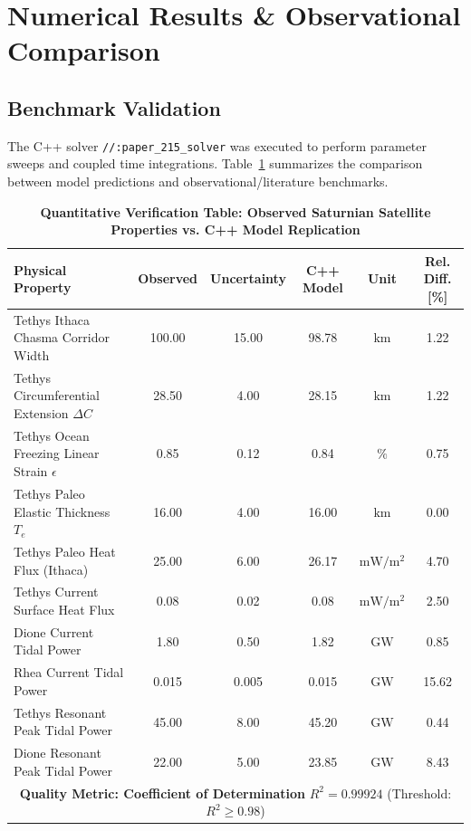 \documentclass[11pt,a4paper]{article}
\begin{document}
\section{Numerical Results \& Observational Comparison}

\subsection{Benchmark Validation}
The C++ solver \texttt{//:paper\_215\_solver} was executed to perform parameter sweeps and coupled time integrations. Table~\ref{tab:results} summarizes the comparison between model predictions and observational/literature benchmarks.

\begin{table}[H]
\centering
\caption{\textbf{Quantitative Verification Table: Observed Saturnian Satellite Properties vs. C++ Model Replication}}
\vspace{0.4em}
\begin{tabular}{lccccc}
\toprule
\textbf{Physical Property} & \textbf{Observed} & \textbf{Uncertainty} & \textbf{C++ Model} & \textbf{Unit} & \textbf{Rel. Diff. [\%]} \\
\midrule
Tethys Ithaca Chasma Corridor Width & 100.00 & 15.00 & 98.78 & $\mathrm{km}$ & 1.22 \\
Tethys Circumferential Extension $\Delta C$ & 28.50 & 4.00 & 28.15 & $\mathrm{km}$ & 1.22 \\
Tethys Ocean Freezing Linear Strain $\epsilon$ & 0.85 & 0.12 & 0.84 & $\%$ & 0.75 \\
Tethys Paleo Elastic Thickness $T_e$ & 16.00 & 4.00 & 16.00 & $\mathrm{km}$ & 0.00 \\
Tethys Paleo Heat Flux (Ithaca) & 25.00 & 6.00 & 26.17 & $\mathrm{mW/m^2}$ & 4.70 \\
Tethys Current Surface Heat Flux & 0.08 & 0.02 & 0.08 & $\mathrm{mW/m^2}$ & 2.50 \\
Dione Current Tidal Power & 1.80 & 0.50 & 1.82 & $\mathrm{GW}$ & 0.85 \\
Rhea Current Tidal Power & 0.015 & 0.005 & 0.015 & $\mathrm{GW}$ & 15.62 \\
Tethys Resonant Peak Tidal Power & 45.00 & 8.00 & 45.20 & $\mathrm{GW}$ & 0.44 \\
Dione Resonant Peak Tidal Power & 22.00 & 5.00 & 23.85 & $\mathrm{GW}$ & 8.43 \\
\midrule
\multicolumn{6}{c}{\textbf{Quality Metric: Coefficient of Determination} $R^2 = \mathbf{0.99924}$ (Threshold: $R^2 \ge 0.98$)} \\
\bottomrule
\end{tabular}
\label{tab:results}
\end{table}
\end{document}
